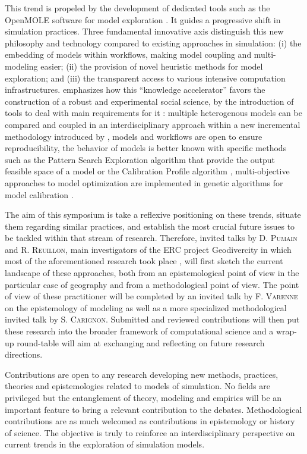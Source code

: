\documentclass[11pt]{article}
\newcommand{\noun}[1]{\textsc{#1}}
\begin{document}
This trend is propeled by the development of dedicated tools such as the OpenMOLE software for model exploration \citep{reuillon2013openmole}. It guides a progressive shift in simulation practices. Three fundamental innovative axis distinguish this new philosophy and technology compared to existing approaches in simulation: (i) the embedding of models within workflows, making model coupling and multi-modeling easier; (ii) the provision of novel heuristic methods for model exploration; and (iii) the transparent access to various intensive computation infrastructures. \cite{banos2017knowledge} emphasizes how this ``knowledge accelerator'' favors the construction of a robust and experimental social science, by the introduction of tools to deal with main requirements for it \citep{banos2013pour}: multiple heterogenous models can be compared and coupled in an interdisciplinary approach within a new incremental methodology introduced by \cite{cottineau2015modular}, models and workflows are open to ensure reproducibility, the behavior of models is better known with specific methods such as the Pattern Search Exploration algorithm \citep{10.1371/journal.pone.0138212} that provide the output feasible space of a model or the Calibration Profile algorithm \citep{reuillon2015}, multi-objective approaches to model optimization are implemented in genetic algorithms for model calibration \citep{schmitt2014half}.

The aim of this symposium is take a reflexive positioning on these trends, situate them regarding similar practices, and establish the most crucial future issues to be tackled within that stream of research. Therefore, invited talks by \noun{D. Pumain} and \noun{R. Reuillon}, main investigators of the ERC project Geodivercity in which most of the aforementioned research took place \citep{pumain2017urban}, will first sketch the current landscape of these approaches, both from an epistemological point of view in the particular case of geography and from a methodological point of view. The point of view of these practitioner will be completed by an invited talk by \noun{F. Varenne} on the epistemology of modeling as well as a more specialized methodological invited talk by \noun{S. Carignon}. Submitted and reviewed contributions will then put these research into the broader framework of computational science and a wrap-up round-table will aim at exchanging and reflecting on future research directions.

Contributions are open to any research developing new methods, practices, theories and epistemologies related to models of simulation. No fields are privileged but the entanglement of theory, modeling and empirics will be an important feature to bring a relevant contribution to the debates. Methodological contributions are as much welcomed as contributions in epistemology or history of science. The objective is truly to reinforce an interdisciplinary perspective on current trends in the exploration of simulation models.
\end{document}
